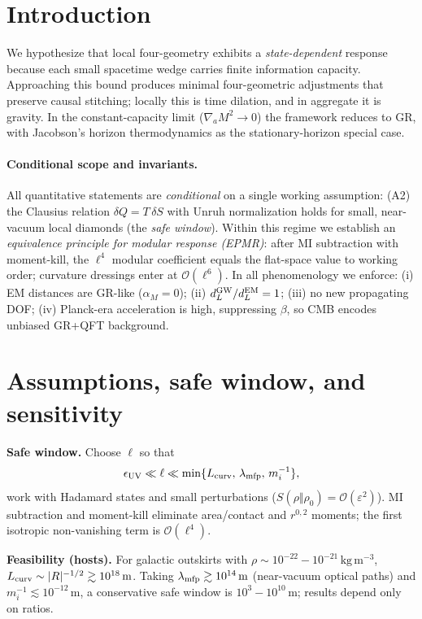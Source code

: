 \documentclass[aps,prd,preprint,onecolumn,longbibliography,nofootinbib]{revtex4-2}
\theoremstyle{plain}
\theoremstyle{remark}
\newcommand{\alM}{\alpha_{\!M}}
\newcommand{\be}{\beta}
\newcommand{\order}[1]{\mathcal{O}\!\left(#1\right)}
\begin{document}
\section{Introduction}
We hypothesize that local four-geometry exhibits a \emph{state-dependent} response because each small spacetime wedge carries finite information capacity. Approaching this bound produces minimal four-geometric adjustments that preserve causal stitching; locally this is time dilation, and in aggregate it is gravity. In the constant-capacity limit ($\nabla_a M^2\!\to\!0$) the framework reduces to GR, with Jacobson's horizon thermodynamics as the stationary-horizon special case.

\paragraph*{Conditional scope and invariants.}
All quantitative statements are \emph{conditional} on a single working assumption: (A2) the Clausius relation $\delta Q=T\,\delta S$ with Unruh normalization holds for small, near-vacuum local diamonds (the \emph{safe window}). Within this regime we establish an \emph{equivalence principle for modular response (EPMR)}: after MI subtraction with moment-kill, the $\ell^4$ modular coefficient equals the flat-space value to working order; curvature dressings enter at $\mathcal{O}(\ell^6)$. In all phenomenology we enforce: (i) EM distances are GR-like ($\alM=0$); (ii) $d_L^{\rm GW}/d_L^{\rm EM}=1$; (iii) no new propagating DOF; (iv) Planck-era acceleration is high, suppressing $\be$, so CMB encodes unbiased GR+QFT background.

\section{Assumptions, safe window, and sensitivity}\label{sec:safewindow}
\textbf{Safe window.} Choose $\ell$ so that
\[
\epsilon_{\rm UV}\ll \ell \ll \min\{L_{\rm curv},\,\lambda_{\rm mfp},\,m_i^{-1}\},
\]
work with Hadamard states and small perturbations ($S(\rho\Vert\rho_0)=\order{\varepsilon^2}$). MI subtraction and moment-kill eliminate area/contact and $r^{0,2}$ moments; the first isotropic non-vanishing term is $\order{\ell^4}$.

\textbf{Feasibility (hosts).} For galactic outskirts with $\rho\sim10^{-22}\!-\!10^{-21}\,\mathrm{kg\,m^{-3}}$, $L_{\rm curv}\sim |R|^{-1/2}\gtrsim 10^{18}\,\mathrm{m}$. Taking $\lambda_{\rm mfp}\gtrsim 10^{14}\,\mathrm{m}$ (near-vacuum optical paths) and $m_i^{-1}\lesssim 10^{-12}\,\mathrm{m}$, a conservative safe window is $10^3\!-\!10^{10}$\,m; results depend only on ratios.
\end{document}
